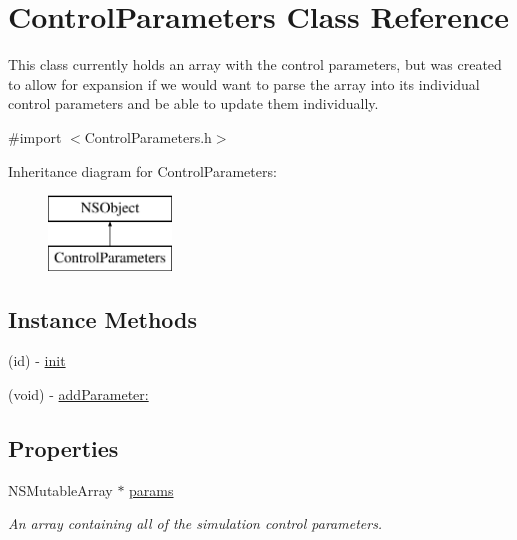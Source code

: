 \hypertarget{interface_control_parameters}{\section{Control\-Parameters Class Reference}
\label{interface_control_parameters}
}


This class currently holds an array with the control parameters, but was created to allow for expansion if we would want to parse the array into its individual control parameters and be able to update them individually.  




{\ttfamily \#import $<$Control\-Parameters.\-h$>$}

Inheritance diagram for Control\-Parameters\-:\begin{figure}[H]
\begin{center}
\leavevmode
\includegraphics[height=2.000000cm]{interface_control_parameters}
\end{center}
\end{figure}
\subsection*{Instance Methods}
\begin{DoxyCompactItemize}
\item 
(id) -\/ \hyperlink{interface_control_parameters_a4213bb26f5207ee3f402fe463badc691}{init}
\item 
(void) -\/ \hyperlink{interface_control_parameters_ab0bbfe8242a098b77c936f8a10df7947}{add\-Parameter\-:}
\end{DoxyCompactItemize}
\subsection*{Properties}
\begin{DoxyCompactItemize}
\item 
\hypertarget{interface_control_parameters_aa66ff297704a6ceeb0b02d1421d9a2c4}{N\-S\-Mutable\-Array $\ast$ \hyperlink{interface_control_parameters_aa66ff297704a6ceeb0b02d1421d9a2c4}{params}}\label{interface_control_parameters_aa66ff297704a6ceeb0b02d1421d9a2c4}

\begin{DoxyCompactList}\small\item\em An array containing all of the simulation control parameters. \end{DoxyCompactList}\end{DoxyCompactItemize}


